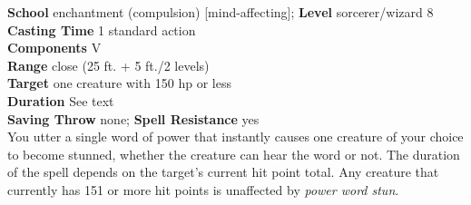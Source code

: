 \textbf{School} enchantment (compulsion) [mind-affecting]; \textbf{Level} sorcerer/wizard 8\\
\textbf{Casting Time} 1 standard action\\
\textbf{Components} V\\
\textbf{Range} close (25 ft. + 5 ft./2 levels)\\
\textbf{Target} one creature with 150 hp or less\\
\textbf{Duration} See text\\
\textbf{Saving Throw} none; \textbf{Spell Resistance} yes\\
You utter a single word of power that instantly causes one creature of your choice to become stunned, whether the creature can hear the word or not. The duration of the spell depends on the target's current hit point total. Any creature that currently has 151 or more hit points is unaffected by \textit{power word stun}.\\
